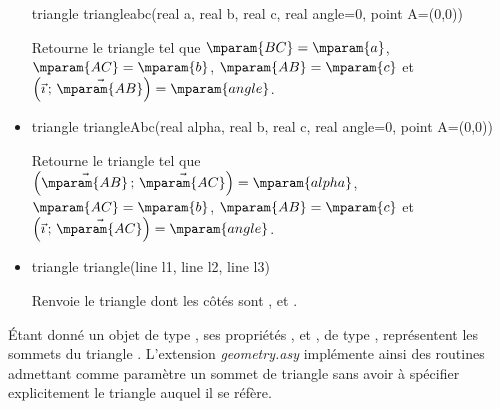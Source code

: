 \documentclass[pdftex]{article}
\newcommand{\Geo}{L'extension \emph{geometry.asy}\xspace}
\begin{document}
\begin{itemize}
\begin{Vcolor}
    triangle triangleabc(real a, real b, real c, real angle=0, point A=(0,0))
  \end{Vcolor}
  Retourne le triangle  tel que
  $\mparam{BC}=\mparam{a}$, $\mparam{AC}=\mparam{b}$,
  $\mparam{AB}=\mparam{c}$ et
  $\left(\vec{\imath}\,;\,\vec{\mparam{AB}}\right)=\mparam{angle}$.
\item {}
  \begin{Vcolor}
    triangle triangleAbc(real alpha, real b, real c, real angle=0, point A=(0,0))
  \end{Vcolor}
  Retourne le triangle  tel que
  $\left(\vec{\mparam{AB}}\,;\,\vec{\mparam{AC}}\right)=\mparam{alpha}$, $\mparam{AC}=\mparam{b}$,
  $\mparam{AB}=\mparam{c}$ et $ \left(\vec{\imath}\,;\,\vec{\mparam{AC}}\right)=\mparam{angle}$.
\item {}
  \begin{Vcolor}
    triangle triangle(line l1, line l2, line l3)
  \end{Vcolor}
  Renvoie le triangle dont les côtés sont , 
  et .
\end{itemize}

Étant donné un objet  de type , ses propriétés
,  et , de type ,
représentent les sommets du triangle . \Geo implémente ainsi
des routines admettant comme paramètre un sommet de triangle sans avoir
à spécifier explicitement le triangle auquel il se réfère.
\end{document}
